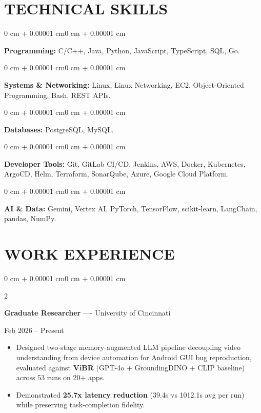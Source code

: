 \documentclass[10pt, letterpaper]{article}
\newenvironment{highlights}{
    \begin{itemize}[
        topsep=0.10 cm,
        parsep=0.06 cm,
        partopsep=0pt,
        itemsep=0.06 cm,
        leftmargin=12pt
    ]
}{
    \end{itemize}
}
\newenvironment{onecolentry}{
    \begin{adjustwidth}{0 cm + 0.00001 cm}{0 cm + 0.00001 cm}
}{
    \end{adjustwidth}
}
\newenvironment{twocolentry}[2][]{
    \onecolentry
    \def\secondColumn{#2}
    \setcolumnwidth{\fill, 4.5 cm}
    \begin{paracol}{2}
}{
    \switchcolumn \raggedleft \secondColumn
    \end{paracol}
    \endonecolentry
}
\begin{document}
\section{TECHNICAL SKILLS}
\begin{onecolentry}
\textbf{Programming:} C/C++, Java, Python, JavaScript, TypeScript, SQL, Go.
\end{onecolentry}
\vspace{0.06 cm}
\begin{onecolentry}
\textbf{Systems \& Networking:} Linux, Linux Networking, EC2, Object-Oriented Programming, Bash, REST APIs.
\end{onecolentry}
\vspace{0.06 cm}
\begin{onecolentry}
\textbf{Databases:} PostgreSQL, MySQL.
\end{onecolentry}
\vspace{0.06 cm}
\begin{onecolentry}
\textbf{Developer Tools:} Git, GitLab CI/CD, Jenkins, AWS, Docker, Kubernetes, ArgoCD, Helm, Terraform, SonarQube, Azure, Google Cloud Platform.
\end{onecolentry}
\vspace{0.06 cm}
\begin{onecolentry}
\textbf{AI \& Data:} Gemini, Vertex AI, PyTorch, TensorFlow, scikit-learn, LangChain, pandas, NumPy.
\end{onecolentry}

\section{WORK EXPERIENCE}
\begin{twocolentry}{Feb 2026 -- Present}
\textbf{Graduate Researcher} ---- University of Cincinnati
\end{twocolentry}
\begin{highlights}
  \item Designed two-stage memory-augmented LLM pipeline decoupling video understanding from device automation for Android GUI bug reproduction, evaluated against \textbf{ViBR} (GPT-4o + GroundingDINO + CLIP baseline) across 53 runs on 20+ apps.
  \item Demonstrated \textbf{25.7x latency reduction} (39.4s vs 1012.1s avg per run) while preserving task-completion fidelity.
\end{highlights}
\end{document}
